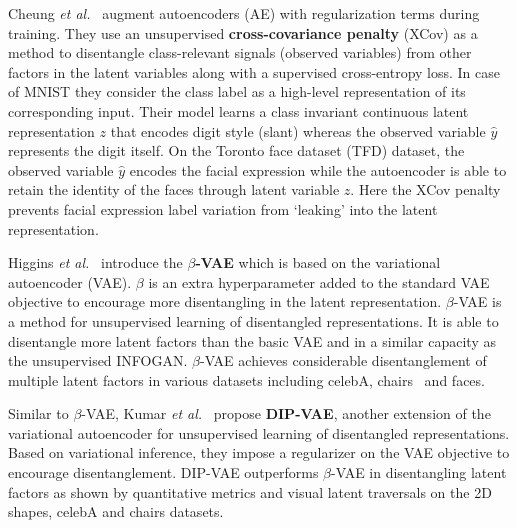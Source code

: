\documentclass[a4paper,12pt]{report}
\begin{document}
\par Cheung \textit{et al.}~\cite{DiscHiddenFoViDN} augment autoencoders (AE) with regularization terms during training. They use an unsupervised \textbf{cross-covariance penalty} (XCov) as a method to disentangle class-relevant signals (observed variables) from other factors in the latent variables along with a supervised cross-entropy loss. In case of MNIST they consider the class label as a high-level representation of its corresponding input. Their model learns a class invariant continuous latent representation $z$ that encodes digit style (slant) whereas the observed variable $\hat{y}$ represents the digit itself. On the Toronto face dataset (TFD) dataset, the observed variable $\hat{y}$ encodes the facial expression while the autoencoder is able to retain the identity of the faces through latent variable $z$. Here the XCov penalty prevents facial expression label variation from ‘leaking’ into the latent representation.

\par Higgins \textit{et al.}~\cite{betaVAE} introduce the \textbf{$\beta$-VAE} which is based on the variational autoencoder (VAE). $\beta$ is an extra hyperparameter added to the standard VAE objective to encourage more disentangling in the latent representation. $\beta$-VAE is a method for unsupervised learning of disentangled representations. It is able to disentangle more latent factors than the basic VAE and in a similar capacity as the unsupervised INFOGAN. $\beta$-VAE achieves considerable disentanglement of multiple latent factors in various datasets including celebA, chairs~\cite{3dChairs} and faces.

Similar to $\beta$-VAE, Kumar \textit{et al.}~\cite{DIPVAE} propose \textbf{DIP-VAE}, another extension of the variational autoencoder for unsupervised learning of disentangled representations. Based on variational inference, they impose a regularizer on the VAE objective to encourage disentanglement. DIP-VAE outperforms $\beta$-VAE in disentangling latent factors as shown by quantitative metrics and visual latent traversals on the 2D shapes, celebA and chairs datasets.
\end{document}
